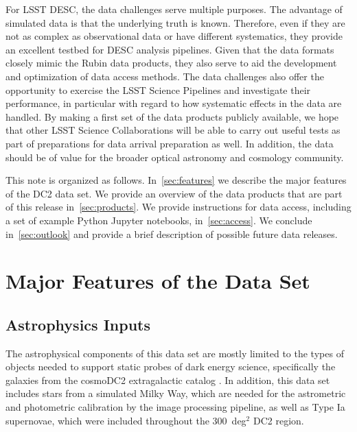 \documentclass[modern]{descnote}
\begin{document}
For LSST DESC, the data challenges serve multiple purposes. The advantage of simulated data is that the underlying truth is known. Therefore, even if they are not as complex as observational data or have different systematics, they provide an excellent testbed for DESC analysis pipelines. Given that the data formats closely mimic the Rubin data products, they also serve to aid the development and optimization of data access methods. The data challenges also offer the opportunity to exercise the LSST Science Pipelines and investigate their performance, in particular with regard to how systematic effects in the data are handled. By making a first set of the data products publicly available, we hope that other LSST Science Collaborations will be able to carry out useful tests as part of preparations for data arrival preparation as well. In addition, the data should be of value for the broader optical astronomy and cosmology community.

This note is organized as follows. In~\autoref{sec:features} we describe the major features of the DC2 data set. We provide an overview of the data products that are part of this release in~\autoref{sec:products}. We provide instructions for data access, including a set of example Python Jupyter notebooks, in~\autoref{sec:access}.
We conclude in~\autoref{sec:outlook} and provide a brief description of possible future data releases. 

\section{Major Features of the Data Set}
\label{sec:features}

\subsection{Astrophysics Inputs}

The astrophysical components of this data set are mostly limited to the types of objects needed to support static probes of dark energy science, specifically the galaxies from the cosmoDC2 extragalactic catalog \citep{korytov}.  In addition, this data set includes stars from a simulated Milky Way, which are needed for the astrometric and photometric calibration by the image processing pipeline, as well as Type Ia supernovae, which were included throughout the 300~deg$^2$ DC2 region.
\end{document}
